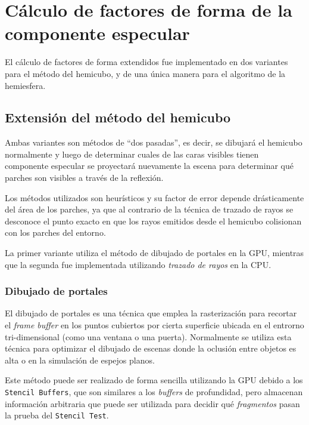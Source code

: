 \section{Cálculo de factores de forma de la componente especular}

El cálculo de factores de forma extendidos fue implementado en dos variantes para el método del hemicubo, y de una única manera para el algoritmo de la hemiesfera.

\subsection{Extensión del método del hemicubo}
Ambas variantes son métodos de “dos pasadas”, es decir, se dibujará el hemicubo normalmente y luego de determinar cuales de las caras visibles tienen componente especular se proyectará nuevamente la escena para determinar qué parches son visibles a través de la reflexión.

Los métodos utilizados son heurísticos y su factor de error depende drásticamente del área de los parches, ya que al contrario de la técnica de trazado de rayos se desconoce el punto exacto en que los rayos emitidos desde el hemicubo colisionan con los parches del entorno.

La primer variante utiliza el método de dibujado de portales en la GPU, mientras que la segunda fue implementada utilizando \textit{trazado de rayos} en la CPU.

\subsubsection{Dibujado de portales}

El dibujado de portales es una técnica que emplea la rasterización para recortar el \textit{frame buffer} en los puntos cubiertos por cierta superficie ubicada en el entrorno tri-dimensional (como una ventana o una puerta). Normalmente se utiliza esta técnica para optimizar el dibujado de escenas donde la oclusión entre objetos es alta o en la simulación de espejos planos.

Este método puede ser realizado de forma sencilla utilizando la GPU debido a los \verb|Stencil Buffers|, que son similares a los \textit{buffers} de profundidad, pero almacenan información arbitraria que puede ser utilizada para decidir qué \textit{fragmentos} pasan la prueba del \verb|Stencil Test|.

